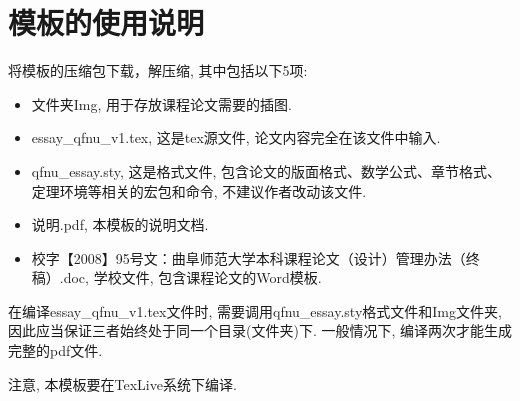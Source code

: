 \section{模板的使用说明}

将模板的压缩包下载，解压缩, 其中包括以下5项:
\begin{itemize}
  \item 文件夹Img, 用于存放课程论文需要的插图.
  \item  essay\_qfnu\_v1.tex, 这是tex源文件, 论文内容完全在该文件中输入.
  \item qfnu\_essay.sty, 这是格式文件, 包含论文的版面格式、数学公式、章节格式、定理环境等相关的宏包和命令, 不建议作者改动该文件.
  \item 说明.pdf, 本模板的说明文档.
  \item 校字【2008】95号文：曲阜师范大学本科课程论文（设计）管理办法（终稿）.doc, 学校文件, 包含课程论文的Word模板.
\end{itemize}
在编译essay\_qfnu\_v1.tex文件时, 需要调用qfnu\_essay.sty格式文件和Img文件夹, 因此应当保证三者始终处于同一个目录(文件夹)下. 一般情况下, 编译两次才能生成完整的pdf文件.

注意, 本模板要在TexLive系统下编译.

